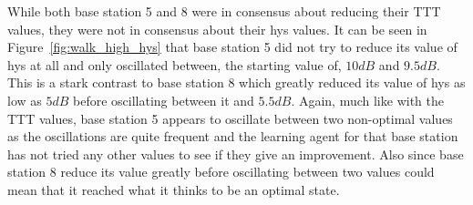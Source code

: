 While both base station 5 and 8 were in consensus about reducing their TTT values, they were not in consensus about their hys values. It can be seen in Figure~\ref{fig:walk_high_hys} that base station 5 did not try to reduce its value of hys at all and only oscillated between, the starting value of, $10 dB$ and $9.5 dB$. This is a stark contrast to base station 8 which greatly reduced its value of hys as low as $5 dB$ before oscillating between it and $5.5 dB$. Again, much like with the TTT values, base station 5 appears to oscillate between two non-optimal values as the oscillations are quite frequent and the learning agent for that base station has not tried any other values to see if they give an improvement. Also since base station 8 reduce its value greatly before oscillating between two values could mean that it reached what it thinks to be an optimal state.
